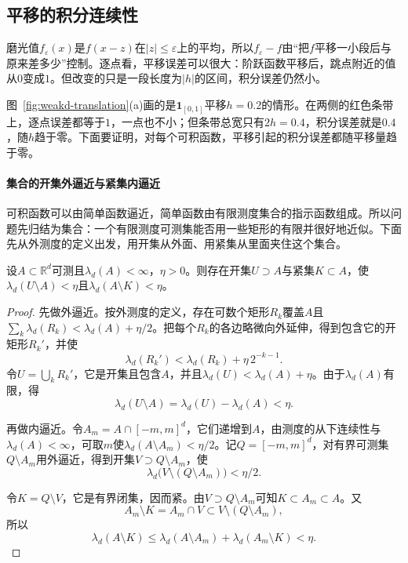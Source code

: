 \subsection{平移的积分连续性}
\label{sec:weakd-translation-continuity}

磨光值$f_\varepsilon(x)$是$f(x-z)$在$\lvert z\rvert\leq\varepsilon$上的平均，所以$f_\varepsilon-f$由“把$f$平移一小段后与原来差多少”控制。逐点看，平移误差可以很大：阶跃函数平移后，跳点附近的值从$0$变成$1$。但改变的只是一段长度为$\lvert h\rvert$的区间，积分误差仍然小。

图~\ref{fig:weakd-translation}(a)画的是$\mathbf 1_{[0,1]}$平移$h=0.2$的情形。在两侧的红色条带上，逐点误差都等于$1$，一点也不小；但条带总宽只有$2h=0.4$，积分误差就是$0.4$，随$h$趋于零。下面要证明，对每个可积函数，平移引起的积分误差都随平移量趋于零。

\paragraph{集合的开集外逼近与紧集内逼近}
可积函数可以由简单函数逼近，简单函数由有限测度集合的指示函数组成。所以问题先归结为集合：一个有限测度可测集能否用一些矩形的有限并很好地近似。下面先从外测度的定义出发，用开集从外面、用紧集从里面夹住这个集合。

\begin{lemma}[Lebesgue测度的外逼近与内逼近]
\label{lem:weakd-regularity}
设$A\subset\mathbb R^d$可测且$\lambda_d(A)<\infty$，$\eta>0$。则存在开集$U\supset A$与紧集$K\subset A$，使$\lambda_d(U\setminus A)<\eta$且$\lambda_d(A\setminus K)<\eta$。
\end{lemma}

\begin{proof}
先做外逼近。按外测度的定义，存在可数个矩形$R_k$覆盖$A$且$\sum_k\lambda_d(R_k)<\lambda_d(A)+\eta/2$。把每个$R_k$的各边略微向外延伸，得到包含它的开矩形$R_k'$，并使
\[
\lambda_d(R_k')<\lambda_d(R_k)+\eta\,2^{-k-1}.
\]
令$U=\bigcup_kR_k'$，它是开集且包含$A$，并且$\lambda_d(U)<\lambda_d(A)+\eta$。由于$\lambda_d(A)$有限，得
\[
\lambda_d(U\setminus A)=\lambda_d(U)-\lambda_d(A)<\eta .
\]

再做内逼近。令$A_m=A\cap[-m,m]^d$，它们递增到$A$，由测度的从下连续性与$\lambda_d(A)<\infty$，可取$m$使$\lambda_d(A\setminus A_m)<\eta/2$。记$Q=[-m,m]^d$，对有界可测集$Q\setminus A_m$用外逼近，得到开集$V\supset Q\setminus A_m$，使
\[
\lambda_d\bigl(V\setminus(Q\setminus A_m)\bigr)<\eta/2 .
\]

令$K=Q\setminus V$，它是有界闭集，因而紧。由$V\supset Q\setminus A_m$可知$K\subset A_m\subset A$。又
\[
A_m\setminus K=A_m\cap V\subset V\setminus(Q\setminus A_m),
\]
所以
\[
\lambda_d(A\setminus K)\leq\lambda_d(A\setminus A_m)+\lambda_d(A_m\setminus K)<\eta .
\]
\end{proof}

